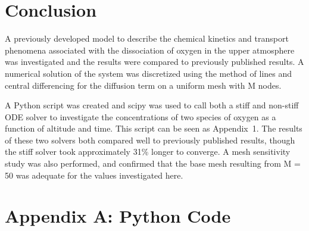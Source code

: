 \documentclass[twocolumn,10pt]{asme2ej}
\begin{document}
\section{Conclusion}
A previously developed model to describe the chemical kinetics and transport phenomena associated with the dissociation of oxygen in the upper atmosphere was investigated and the results were compared to previously published results. A numerical solution of the system was discretized using the method of lines and central differencing for the diffusion term on a uniform mesh with M nodes.

A Python script was created and scipy was used to call both a stiff and non-stiff ODE solver to investigate the concentrations of two species of oxygen as a function of altitude and time. This script can be seen as Appendix~1. The results of these two solvers both compared well to previously published results, though the stiff solver took approximately 31\% longer to converge. A mesh sensitivity study was also performed, and confirmed that the base mesh resulting from M = 50 was adequate for the values investigated here.

\nocite{*}



\clearpage
\onecolumn
\appendix       %
\section*{Appendix A: Python Code}




\end{document}

